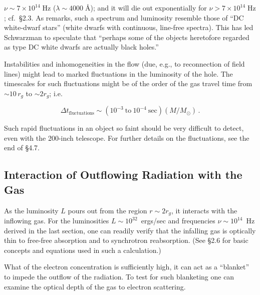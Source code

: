 \documentclass[aps,prd,twocolumn,superscriptaddress,nofootinbib]{revtex4-2}
\begin{document}

$\nu \sim 7 \times 10^{14}\;\text{Hz}$
($\lambda \sim 4000\;\text{\AA}$); and it will die out exponentially for
$\nu > 7 \times 10^{14}\;\text{Hz}$; cf.\ \S2.3.
As \cite{Schwarzman1971} remarks, such a spectrum
and luminosity resemble those of ``DC white-dwarf stars'' (white dwarfs with
continuous, line-free spectra).  This has led Schwarzman to speculate that
``perhaps some of the objects heretofore regarded as type DC white dwarfs are
actually black holes.''

Instabilities and inhomogeneities in the flow (due, e.g., to reconnection of
field lines) might lead to marked fluctuations in the luminosity of the hole.  The
timescales for such fluctuations might be of the order of the gas travel time from
${\sim}10\,r_g$ to ${\sim}2r_g$; i.e.

\begin{equation}
\Delta t_{\text{fluctuations}} \sim (10^{-3}~\text{to}~10^{-4}~\text{sec})(M/M_\odot)\,.
\tag{4.4.8}
\end{equation}

Such rapid fluctuations in an object so faint should be very difficult to detect,
even with the 200-inch telescope.  For further details on the fluctuations, see
the end of \S4.7.


\subsection{Interaction of Outflowing Radiation with the Gas}
\label{sec:4.5}

As the luminosity $L$ pours out from the region $r \sim 2r_g$, it interacts with the
inflowing gas.  For the luminosities $L \sim 10^{32}$~ergs/sec and frequencies $\nu \sim 10^{14}$~Hz
derived in the last section, one can readily verify that the infalling gas is optically
thin to free-free absorption and to synchrotron reabsorption.  (See \S2.6 for
basic concepts and equations used in such a calculation.)

What of the electron concentration is sufficiently high, it can act as a ``blanket'' to
impede the outflow of the radiation.  To test for such blanketing one can examine
the optical depth of the gas to electron scattering.
\end{document}
